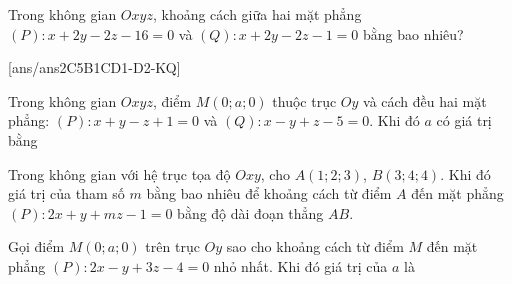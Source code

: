 \begin{ex}%
	Trong không gian $Oxyz$, khoảng cách giữa hai mặt phẳng $(P)\colon x+2 y-2 z-16=0$ và $(Q)\colon x+2 y-2 z-1=0$ bằng bao nhiêu?
\end{ex}
\TNSA
{}[ans/ans2C5B1CD1-D2-KQ]
\begin{ex} %
	Trong không gian $Oxyz$, điểm $M \left(0;a;0\right)$ thuộc trục $Oy$ và cách đều hai mặt phẳng: $\left(P\right) \colon x+y-z+1=0$ và $\left(Q\right) \colon x-y+z-5=0$. Khi đó $a$ có giá trị bằng
\end{ex}

\begin{ex} %
	Trong không gian với hệ trục tọa độ $Oxy$, cho $A \left(1;2;3\right)$, $B \left(3;4;4\right)$. Khi đó giá trị của tham số $m$ bằng bao nhiêu để khoảng cách từ điểm $A$ đến mặt phẳng $\left(P\right)\colon 2x + y + mz -1=0$ bằng độ dài đoạn thẳng $AB$.
\end{ex}

\begin{ex} %
	Gọi điểm $M \left(0;a;0\right)$ trên trục $Oy$ sao cho khoảng cách từ điểm $M$ đến mặt phẳng $\left(P\right) \colon 2x-y+3z-4=0$ nhỏ nhất. Khi đó giá trị của $a$ là
\end{ex}

